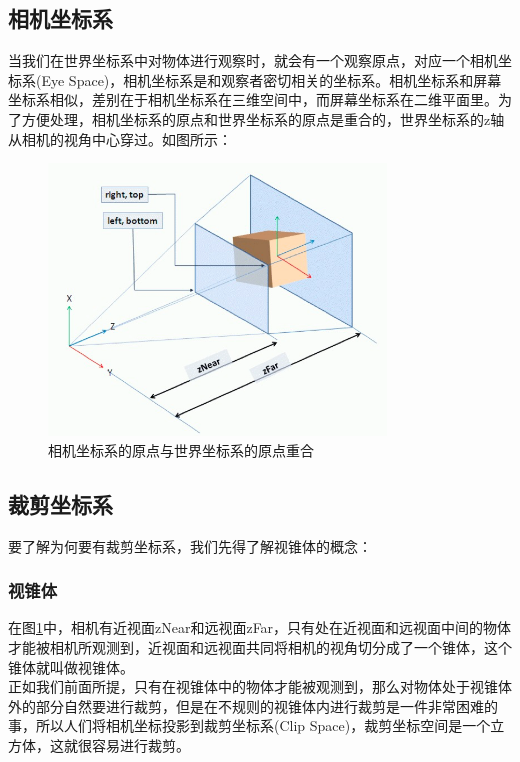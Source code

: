     \subsection{相机坐标系}
    \begin{spacing}{2.5}
    当我们在世界坐标系中对物体进行观察时，就会有一个观察原点，对应一个相机坐标系(Eye Space)，相机坐标系是和观察者密切相关的坐标系。相机坐标系和屏幕坐标系相似，差别在于相机坐标系在三维空间中，而屏幕坐标系在二维平面里。为了方便处理，相机坐标系的原点和世界坐标系的原点是重合的，世界坐标系的z轴从相机的视角中心穿过。如图所示：
    \begin{figure}[H]
		\centering
		\includegraphics[width=0.8\textwidth]{images/camera.png}
		\caption{相机坐标系的原点与世界坐标系的原点重合}
		\label{camera}
	\end{figure}
    \end{spacing}
    
    \subsection{裁剪坐标系}
    \begin{spacing}{2.5}
    要了解为何要有裁剪坐标系，我们先得了解视锥体的概念：
    \subsubsection{视锥体}
    在图\ref{camera}中，相机有近视面zNear和远视面zFar，只有处在近视面和远视面中间的物体才能被相机所观测到，近视面和远视面共同将相机的视角切分成了一个锥体，这个锥体就叫做视锥体。\\ 
    \indent 正如我们前面所提，只有在视锥体中的物体才能被观测到，那么对物体处于视锥体外的部分自然要进行裁剪，但是在不规则的视锥体内进行裁剪是一件非常困难的事，所以人们将相机坐标投影到裁剪坐标系(Clip Space)，裁剪坐标空间是一个立方体，这就很容易进行裁剪。
    \end{spacing}
    
